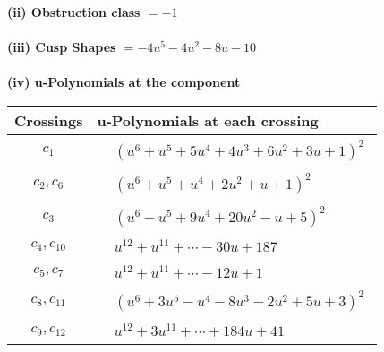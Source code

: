 \documentclass[1p]{elsarticle_modified}
\theoremstyle{definition}
\begin{document}
\flushleft \textbf{(ii) Obstruction class $= -1$}\\~\\
\flushleft \textbf{(iii) Cusp Shapes $= -4 u^5-4 u^2-8 u-10$}\\~\\
\newpage\renewcommand{\arraystretch}{1}
\flushleft \textbf{(iv) u-Polynomials at the component}\newline \\
\begin{tabular}{m{50pt}|m{274pt}}
Crossings & \hspace{64pt}u-Polynomials at each crossing \\
\hline $$\begin{aligned}c_{1}\end{aligned}$$&$\begin{aligned}
&(u^6+u^5+5 u^4+4 u^3+6 u^2+3 u+1)^2
\end{aligned}$\\
\hline $$\begin{aligned}c_{2},c_{6}\end{aligned}$$&$\begin{aligned}
&(u^6+u^5+u^4+2 u^2+u+1)^2
\end{aligned}$\\
\hline $$\begin{aligned}c_{3}\end{aligned}$$&$\begin{aligned}
&(u^6- u^5+9 u^4+20 u^2- u+5)^2
\end{aligned}$\\
\hline $$\begin{aligned}c_{4},c_{10}\end{aligned}$$&$\begin{aligned}
&u^{12}+u^{11}+\cdots-30 u+187
\end{aligned}$\\
\hline $$\begin{aligned}c_{5},c_{7}\end{aligned}$$&$\begin{aligned}
&u^{12}+u^{11}+\cdots-12 u+1
\end{aligned}$\\
\hline $$\begin{aligned}c_{8},c_{11}\end{aligned}$$&$\begin{aligned}
&(u^6+3 u^5- u^4-8 u^3-2 u^2+5 u+3)^2
\end{aligned}$\\
\hline $$\begin{aligned}c_{9},c_{12}\end{aligned}$$&$\begin{aligned}
&u^{12}+3 u^{11}+\cdots+184 u+41
\end{aligned}$\\
\hline
\end{tabular}\\~\\
\end{document}
